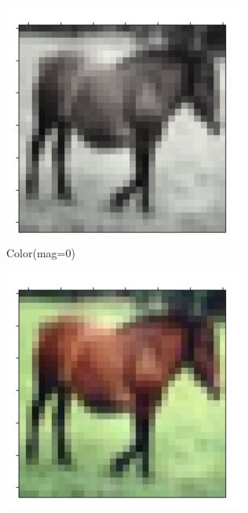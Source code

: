 \documentclass[onecolumn]{ujarticle}   %
\begin{document}
\begin{figure}[h]
      \begin{subfigure}{0.3\columnwidth}
        \centering
        \includegraphics[width=1.0\columnwidth]{transform_test/Color_0.png}
        \caption{Color(mag=0)}
        \label{fig:Color_0}
      \end{subfigure}
      \begin{subfigure}{0.3\columnwidth}
        \centering
        \includegraphics[width=1.0\columnwidth]{transform_test/Color_15.png}

\end{subfigure}
\end{figure}
\end{document}
